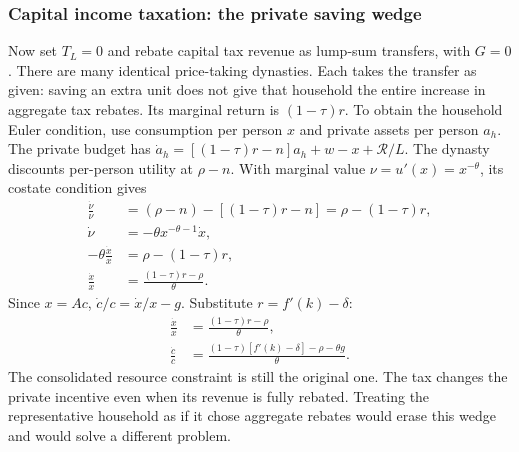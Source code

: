 \subsubsection{Capital income taxation: the private saving wedge}

Now set $T_L=0$ and rebate capital tax revenue as lump-sum transfers, with
$G=0$. There are many identical price-taking dynasties. Each takes the transfer
as given: saving an extra unit does not give that household the entire
increase in aggregate tax rebates. Its marginal return is $(1-\tau)r$.
To obtain the household Euler condition, use consumption per person $x$
and private assets per person $a_h$. The private budget has
$\dot a_h=[(1-\tau)r-n]a_h+w-x+\mathcal R/L$.
The dynasty discounts per-person utility at $\rho-n$. With marginal value
$\nu=u'(x)=x^{-\theta}$, its costate condition gives
\begin{align}
\frac{\dot\nu}{\nu}
 &=(\rho-n)-[(1-\tau)r-n]=\rho-(1-\tau)r,\\
\dot\nu&=-\theta x^{-\theta-1}\dot x,\\
-\theta\frac{\dot x}{x}&=\rho-(1-\tau)r,\\
\frac{\dot x}{x}&=\frac{(1-\tau)r-\rho}{\theta}.
\end{align}
Since $x=Ac$, $\dot c/c=\dot x/x-g$. Substitute $r=f'(k)-\delta$:
\begin{align}
\frac{\dot x}{x}&=\frac{(1-\tau)r-\rho}{\theta},\\
\frac{\dot c}{c}&=
\frac{(1-\tau)[f'(k)-\delta]-\rho-\theta g}{\theta}.
\label{eq:ramsey-tax-euler}
\end{align}
The consolidated resource constraint is still the original one. The tax changes
the private incentive even when its revenue is fully rebated. Treating the
representative household as if it chose aggregate rebates would erase this
wedge and would solve a different problem.

